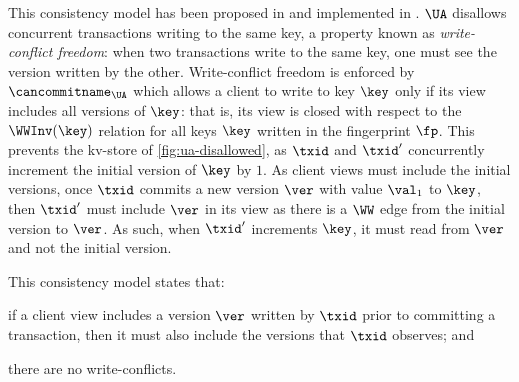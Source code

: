 This consistency model has been proposed in \citet{framework-concur} 
and implemented in \citet{rola}.
\(\UA\) disallows concurrent transactions writing to the same key,
a property known as \emph{write-conflict freedom}:  
when two transactions write to the same key, one must see the version 
written by the other.
Write-conflict freedom is enforced by \(\cancommitname_{\UA}\) which
allows a client to write to key \(\key\) only if its view includes all
versions of \(\key\): that is,  its view is closed with respect to the \(\WWInv(\key)\) relation for all keys \(\key\) written in the fingerprint \(\fp\).
This prevents the kv-store of \cref{fig:ua-disallowed},
as \(\txid\) and \(\txid'\) concurrently increment the initial version of \(\key\) by \(1\).
As client views must include the initial versions, once \(\txid\) commits a new version \(\ver\) with value \(\val_1\) to \(\key\), then \(\txid'\) must include \(\ver\) in its view as there is a \(\WW\) edge from the initial version to \(\ver\). 
As such, when \(\txid'\) increments \(\key\), it must read from \(\ver\) and not the initial version.%

This consistency model states that: 
\begin{enumerate*}
	\item if a client view includes a version \(\ver\) written by \( \txid \) prior to committing a transaction, 
then it must also include the versions that \(\txid\) observes; and
	\item there are no write-conflicts.
\end{enumerate*}

